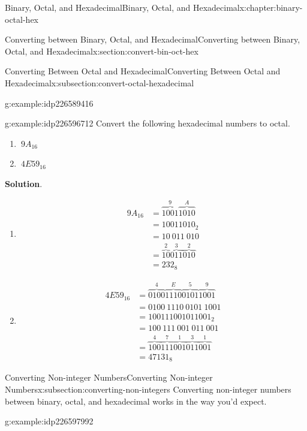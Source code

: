 \documentclass[twoside,10pt,]{book}
\newcommand{\blocktitlefont}{\relax}
\numberwithin{equation}{section}
\newcommand{\amp}{&}
\begin{document}
\begin{chapterptx}{Binary, Octal, and Hexadecimal}{}{Binary, Octal, and Hexadecimal}{}{}{x:chapter:binary-octal-hex}
\begin{sectionptx}{Converting between Binary, Octal, and Hexadecimal}{}{Converting between Binary, Octal, and Hexadecimal}{}{}{x:section:convert-bin-oct-hex}
\begin{subsectionptx}{Converting Between Octal and Hexadecimal}{}{Converting Between Octal and Hexadecimal}{}{}{x:subsection:convert-octal-hexadecimal}
\begin{example}{}{g:example:idp226589416}
\begin{enumerate}
%
\end{enumerate}
\end{example}
\begin{example}{}{g:example:idp226596712}%
Convert the following hexadecimal numbers to octal. %
\begin{enumerate}
\item{}\(\displaystyle \ 9A_{16}\)%
\item{}\(\displaystyle \ 4E59_{16}\)%
\end{enumerate}
\par\smallskip%
\noindent\textbf{\blocktitlefont Solution}.\label{g:solution:idp226604008}{}\hypertarget{g:solution:idp226604008}{}\quad{}%
\begin{enumerate}
\item{}%
\begin{align*}
9A_{16} \amp = \overbrace{1001}^9\overbrace{1010}^A\\
\amp = 10011010_2\\
\amp = 10\ 011\ 010\\
\amp = \overbrace{10}^2\overbrace{011}^3\overbrace{010}^2\\
\amp = 232_8
\end{align*}
%
\item{}%
\begin{align*}
4E59_{16} \amp = \overbrace{0100}^4\overbrace{1110}^E\overbrace{0101}^5\overbrace{1001}^9\\
\amp = 0100\ 1110\ 0101\ 1001\\
\amp = 100111001011001_2\\
\amp = 100\ 111\ 001\ 011\ 001\\
\amp = \overbrace{100}^4\overbrace{111}^7\overbrace{001}^1\overbrace{011}^3\overbrace{001}^1\\
\amp = 47131_8
\end{align*}
%
\end{enumerate}
\end{example}
\end{subsectionptx}
%
%
\typeout{************************************************}
\typeout{************************************************}
%
\begin{subsectionptx}{Converting Non-integer Numbers}{}{Converting Non-integer Numbers}{}{}{x:subsection:converting-non-integers}
Converting non-integer numbers between binary, octal, and hexadecimal works in the way you'd expect.%
\begin{example}{}{g:example:idp226597992}%

\end{example}
\end{subsectionptx}
\end{sectionptx}
\end{chapterptx}
\end{document}
